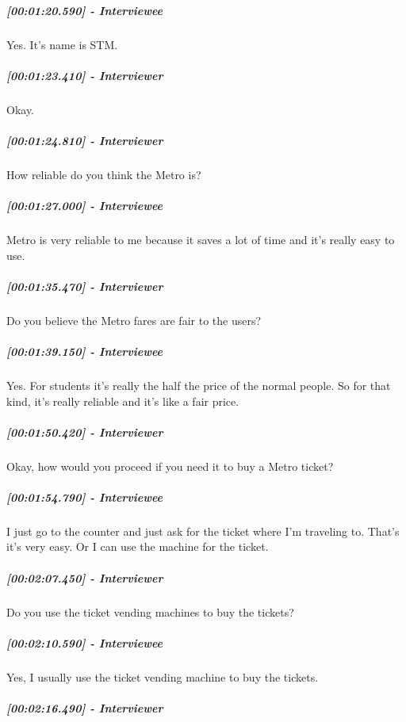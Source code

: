 \documentclass[a4paper,12pt]{article}
\begin{document}
\hypertarget{interviewee-6}{%
\subparagraph{{[}00:01:20.590{]} - Interviewee}\label{interviewee-6}}

Yes. It's name is STM.

\hypertarget{interviewer-9}{%
\subparagraph{{[}00:01:23.410{]} - Interviewer}\label{interviewer-9}}

Okay.

\hypertarget{interviewer-10}{%
\subparagraph{{[}00:01:24.810{]} - Interviewer}\label{interviewer-10}}

How reliable do you think the Metro is?

\hypertarget{interviewee-7}{%
\subparagraph{{[}00:01:27.000{]} - Interviewee}\label{interviewee-7}}

Metro is very reliable to me because it saves a lot of time and it's
really easy to use.

\hypertarget{interviewer-11}{%
\subparagraph{{[}00:01:35.470{]} - Interviewer}\label{interviewer-11}}

Do you believe the Metro fares are fair to the users?

\hypertarget{interviewee-8}{%
\subparagraph{{[}00:01:39.150{]} - Interviewee}\label{interviewee-8}}

Yes. For students it's really the half the price of the normal people.
So for that kind, it's really reliable and it's like a fair price.

\hypertarget{interviewer-12}{%
\subparagraph{{[}00:01:50.420{]} - Interviewer}\label{interviewer-12}}

Okay, how would you proceed if you need it to buy a Metro ticket?

\hypertarget{interviewee-9}{%
\subparagraph{{[}00:01:54.790{]} - Interviewee}\label{interviewee-9}}

I just go to the counter and just ask for the ticket where I'm traveling
to. That's it's very easy. Or I can use the machine for the ticket.

\hypertarget{interviewer-13}{%
\subparagraph{{[}00:02:07.450{]} - Interviewer}\label{interviewer-13}}

Do you use the ticket vending machines to buy the tickets?

\hypertarget{interviewee-10}{%
\subparagraph{{[}00:02:10.590{]} - Interviewee}\label{interviewee-10}}

Yes, I usually use the ticket vending machine to buy the tickets.

\hypertarget{interviewer-14}{%
\subparagraph{{[}00:02:16.490{]} - Interviewer}\label{interviewer-14}}
\end{document}

